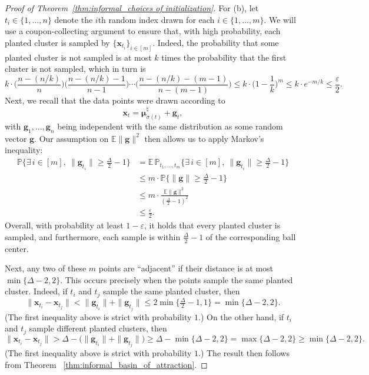 \documentclass{article}
\theoremstyle{plain}
\theoremstyle{definition}
\newcommand{\1}{\mathbf{1}}
\newcommand{\hmu}{\bm{\mu}^\natural}
\begin{document}
\begin{proof}[Proof of Theorem~\ref{thm:informal_choices of initialization}]
For (b), let $t_i\in\{1,\ldots,n\}$ denote the $i$th random index drawn for each $i\in\{1,\ldots,m\}$.
We will use a coupon-collecting argument to ensure that, with high probability, each planted cluster is sampled by $\{\bm{x}_{t_i}\}_{i\in[m]}$.
Indeed, the probability that some planted cluster is not sampled is at most $k$ times the probability that the first cluster is not sampled, which in turn is
\[
k\cdot \bigg(\frac{n-(n/k)}{n}\bigg)\bigg(\frac{n-(n/k)-1}{n-1}\bigg)\cdots\bigg(\frac{n-(n/k)-(m-1)}{n-(m-1)}\bigg)
\leq k\cdot\bigg(1-\frac{1}{k}\bigg)^m
\leq k\cdot e^{-m/k}
\leq \frac{\varepsilon}{2}.
\]
Next, we recall that the data points were drawn according to
\[
\bm{x}_{t}
=\hmu_{\sigma(t)}+\bm{g}_{t},
\]
with $\bm{g}_1,\ldots,\bm{g}_n$ being independent with the same distribution as some random vector $\bm{g}$.
Our assumption on $\mathbb{E}\|\bm{g}\|^2$ then allows us to apply Markov's inequality:
\begin{align*}
\mathbb{P}\bigg\{\exists\, i\in[m],~\|\bm{g}_{t_i}\|\geq\frac{\Delta}{2}-1
\bigg\}
&=\mathbb{E}\,\mathbb{P}_{t_1,\ldots,t_m}\bigg\{\exists \,i\in[m],~\|\bm{g}_{t_i}\|\geq\frac{\Delta}{2}-1
\bigg\}\\
&\leq m\cdot \mathbb{P}\bigg\{\|\bm{g}\|\geq\frac{\Delta}{2}-1\bigg\}\\
&\leq m\cdot\frac{\mathbb{E}\|\bm{g}\|^2}{(\frac{\Delta}{2}-1)^2}\\
&\leq\frac{\varepsilon}{2}.
\end{align*}
Overall, with probability at least $1-\varepsilon$, it holds that every planted cluster is sampled, and furthermore, each sample is within $\frac{\Delta}{2}-1$ of the corresponding ball center.

Next, any two of these $m$ points are ``adjacent'' if their distance is at most $\min\{\Delta-2,2\}$.
This occurs precisely when the points sample the same planted cluster.
Indeed, if $t_i$ and $t_j$ sample the same planted cluster, then
\[
\|\bm{x}_{t_i}-\bm{x}_{t_j}\|
<\|\bm{g}_{t_i}\|+\|\bm{g}_{t_j}\|
\leq 2\min\{\tfrac{\Delta}{2}-1,1\}
=\min\{\Delta-2,2\}.
\]
(The first inequality above is strict with probability $1$.)
On the other hand, if $t_i$ and $t_j$ sample different planted clusters, then
\[
\|\bm{x}_{t_i}-\bm{x}_{t_j}\|
>\Delta-\big(\|\bm{g}_{t_i}\|+\|\bm{g}_{t_j}\|\big)
\geq\Delta-\min\{\Delta-2,2\}
=\max\{\Delta-2,2\}
\geq\min\{\Delta-2,2\}.
\]
(The first inequality above is strict with probability $1$.)
The result then follows from Theorem ~\ref{thm:informal_basin_of_attraction}.
\end{proof}
\end{document}
